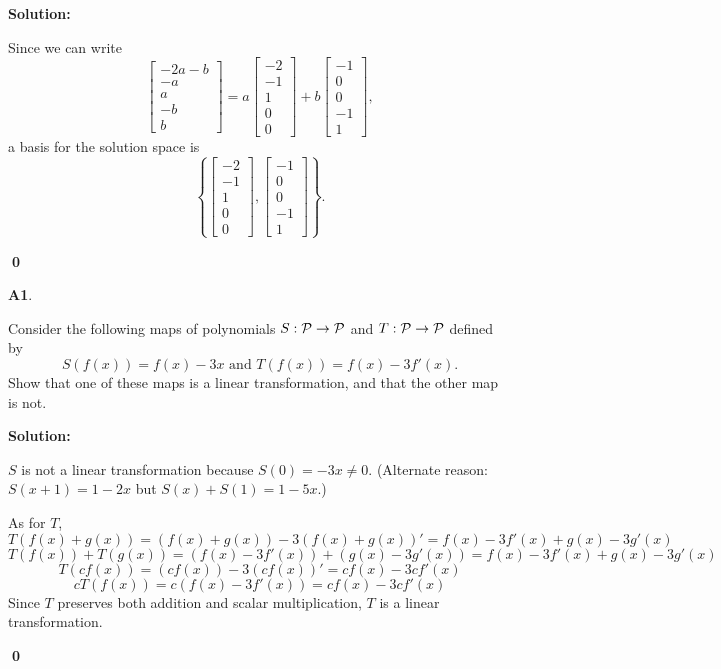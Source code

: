 \documentclass{article}
\newenvironment{problem}[1]
{
  \begin{flushleft}
  \textbf{#1}.
  \ignorespaces
}
{
  \end{flushleft}
}
\newenvironment{solution}
{
  \ignorespaces
  \textbf{Solution:}
}
{
  \ignorespacesafterend
  \begin{flushright}
  {\bfseries \qed}
  \end{flushright}
}
\begin{document}
\begin{solution}
Since we can write \[\begin{bmatrix} -2a-b \\ -a \\ a \\ -b \\ b \end{bmatrix} = a \begin{bmatrix} -2 \\ -1 \\ 1 \\ 0 \\ 0 \end{bmatrix} + b \begin{bmatrix} -1 \\ 0 \\ 0 \\ -1 \\ 1 \end{bmatrix}, \]
a basis for the solution space is
\[ \left \{ \begin{bmatrix} -2 \\ -1 \\ 1 \\ 0 \\ 0 \end{bmatrix} , \begin{bmatrix} -1 \\ 0 \\ 0 \\ -1 \\ 1 \end{bmatrix} \right\}.\]
\end{solution}

\begin{problem}{A1}
Consider the following maps of polynomials \(S: \P \rightarrow \P\)
and \(T:\P\rightarrow\P\) defined by
\[S(f(x))= f(x)-3x \text{ and }T(f(x)) = f(x)-3f'(x).\]
Show that one of these maps is a linear transformation, and that the other
map is not.
\end{problem}
\begin{solution}
\(S\) is not a linear transformation because \(S(0)=-3x\not=0\).
(Alternate reason: \(S(x+1)=1-2x\) but \(S(x)+S(1)=1-5x\).)

As for \(T\),
\[
  T(f(x)+g(x))=(f(x)+g(x))-3(f(x)+g(x))'=f(x)-3f'(x)+g(x)-3g'(x)
\]
\[
  T(f(x))+T(g(x))=(f(x)-3f'(x))+(g(x)-3g'(x))=f(x)-3f'(x)+g(x)-3g'(x)
\]
\[
	T(cf(x))=(cf(x))-3(cf(x))'=cf(x)-3cf'(x)
\]
\[
	cT(f(x))=c(f(x)-3f'(x))=cf(x)-3cf'(x)
\]
Since \(T\) preserves both addition and scalar multiplication,
\(T\) is a linear transformation.
\end{solution}
\end{document}

